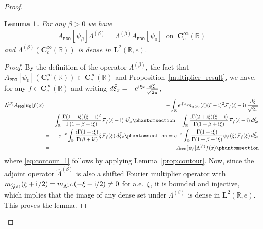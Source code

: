 \documentclass[12pt]{amsart}
\newcommand{\hlabel}{\phantomsection\label}
\newcommand{\hptg}[2]{\hypertarget{#1}{#2}}
\numberwithin{equation}{section}
\newcommand{\bb}{\mathbb}
\newcommand{\ttt}{\mathtt}
\newcommand{\bmrm}[2][2]{\mathbf{#2}^{#1}}
\newcommand{\C}{\mathbf{C}}
\renewcommand{\i}{\mathrm{i}}
\newcommand{\LRe}{\bmrm{L}(\bb{R},e)}
\newtheorem{lem}[thm]{Lemma}
\theoremstyle{definition}
\theoremstyle{assump}
\theoremstyle{remark}
\begin{document}
{\begin{proof}
\begin{lem}\label{lem:beta}
For any $\beta>0$ we have
\begin{align*}
A_{\ttt{PDO}}[\psi_\beta]\Lambda^{\!(\beta)} =\Lambda^{\!(\beta)} A_\ttt{PDO}[\psi_0] \ \mbox{ on } \  \C^\infty_c(\bb{R})
\end{align*}
and $\Lambda^{\!(\beta)}(\C^\infty_c(\bb{R}))$ is dense in $\bmrm{L}(\bb{R},e)$.
\end{lem}
\begin{proof}
By the definition of the  operator $\Lambda^{\!(\beta)}$, the fact that $A_\ttt{PDO}[\psi_0](\C^\infty_c(\bb R))\subset\C^\infty_c(\bb R)$ and Proposition~\ref{multiplier_result},
we have, for any $f\in \C^\infty_c(\bb{R})$ and writing $d\tilde{\xi}_x=-e^{{\rm{i}}\xi   x}\frac{d\xi}{\sqrt{2\pi}}$,
\begin{eqnarray}
\Lambda^{\!(\beta)} A_\ttt{PDO}[\psi_0]f(x)&=&-\int_{\bb{R}}e^{{\rm{i}}\xi   x}m_{\Lambda^{(\beta)}}(\xi)(\xi-{\rm{i}})   ^2\mathcal{F}_{f}(\xi-{\rm{i}})   \,\frac{d\xi}{\sqrt{2\pi}} \nonumber \\
&=&\int_\bb{R} \frac{\Gamma(1+{\rm{i}}\xi  )(\xi-{\rm{i}})^2}{\Gamma(1+\beta+{\rm{i}}\xi  )}\mathcal{F}_{f}(\xi-{\rm{i}})   \,d\tilde{\xi}_x \hlabel{eq:step_2}=\int_\bb{R} \frac{\rm{i}\Gamma(2+{\rm{i}}\xi )(\xi-{\rm{i}})}{\Gamma(1+\beta+{\rm{i}}\xi  )}   \mathcal{F}_{f}(\xi-{\rm{i}})   \,d\tilde{\xi}_x \\
&=&e^{-x}\int_\bb{R} \frac{{\rm{i}}\Gamma(1+{\rm{i}}\xi  )}{\Gamma(\beta+{\rm{i}}\xi  )}\xi\mathcal{F}_{f}(\xi)\,d\tilde{\xi}_x\hlabel{eq:contour_1}
 =e^{-x}\int_\bb{R}\frac{\Gamma(1+{\rm{i}}\xi  )}{\Gamma(1+\beta+{\rm{i}}\xi  )}\psi_\beta(\xi)\mathcal{F}_{f}(\xi)\,d\tilde{\xi}_x  \\ &=&A_\ttt{PDO}[\psi_\beta]\Lambda^{\!(\beta)}f(x)\hlabel{eq:intertwining_pdo}
\end{eqnarray}
where \eqref{eq:contour_1} follows  by applying Lemma~\ref{prop:contour}. \hptg{C40}{Now, since the adjoint operator $\widehat{\Lambda}^{\!(\beta)}$ is also a shifted Fourier multiplier operator with $m_{\widehat{\Lambda}^{\!(\beta)}}(\xi+{\rm{i}}/2)=m_{\Lambda^{\!(\beta)}}(-\xi+{\rm{i}}/2)\neq 0$ for a.e.~$\xi$, it is bounded and injective, which implies that the image of any dense set under $\Lambda^{(\beta)}$ is dense in $\LRe$. This proves the lemma.}
\end{proof}

\end{proof}}
\end{document}
